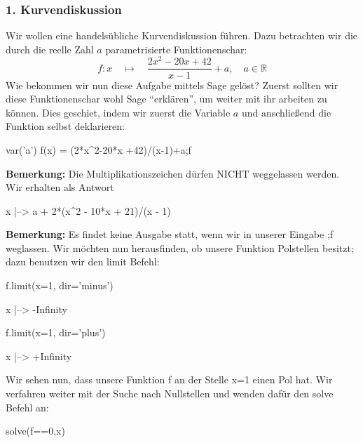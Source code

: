 \documentclass[fontsize=12pt,paper=a4,twoside,bibtotoc,idxtotoc,
liststotoc,pagesize,BCOR1.2cm,DIV15,chapterprefix,pagesize=pdftex]{scrbook}
\begin{document}
\subsubsection{1. Kurvendiskussion}

Wir wollen eine handelsübliche Kurvendiskussion führen. Dazu betrachten wir die durch die reelle Zahl $a$ parametrisierte 
Funktionenschar:
\[ 
f: x \quad \mapsto \quad \frac{2x^2-20x+42}{x-1}+a, \quad
a \in \mathbb{R} 
\]
Wie bekommen wir nun diese Aufgabe mittels Sage gelöst? Zuerst sollten wir diese Funktionenschar wohl Sage ``erklären'', 
um weiter mit ihr arbeiten zu können. Dies geschiet, indem wir zuerst die Variable $a$ und anschließend die Funktion selbst 
deklarieren:\newline
\begin{sagein}
var('a')
f(x) = (2*x^2-20*x +42)/(x-1)+a;f
\end{sagein}
\textbf{Bemerkung:} Die Multiplikationszeichen dürfen NICHT weggelassen werden.\newline
Wir erhalten als Antwort\newline
\begin{sageout}
  x |--> a + 2*(x^2 - 10*x + 21)/(x - 1)
\end{sageout}
\textbf{Bemerkung:} Es findet keine Ausgabe statt, wenn wir in unserer Eingabe ;f weglassen.\newline
Wir möchten nun herausfinden, ob unsere Funktion Polstellen besitzt; dazu benutzen wir den limit Befehl:\newline
\begin{sagein}
f.limit(x=1, dir='minus')
\end{sagein}
\begin{sageout}
  x |--> -Infinity
\end{sageout}
\begin{sagein}
f.limit(x=1, dir='plus') 
\end{sagein}
\begin{sageout}
  x |--> +Infinity
\end{sageout}
Wir sehen nun, dass unsere Funktion f an der Stelle x=1 einen Pol hat. Wir verfahren weiter mit der Suche nach Nullstellen 
und wenden dafür den solve Befehl an:\newline
\begin{sagein}
solve(f==0,x)
\end{sagein}
\begin{sageout}
[x == -1/4*a - 1/4*sqrt(a^2 - 32*a + 64) + 5, x == -1/4*a + 1/4*sqrt(a^2 - 32*a + 64) + 5]
\end{sageout}
\end{document}
